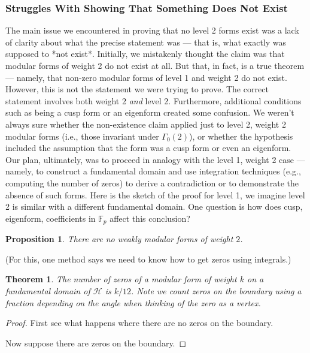 \documentclass{article}
\newtheorem{theorem}{Theorem}[section]
\newtheorem{proposition}{Proposition}[section]
\theoremstyle{definition}
\theoremstyle{definition}
\theoremstyle{definition}
\newcommand{\F}{\mathbb{F}}
\begin{document}
\subsubsection{Struggles With Showing That Something Does Not Exist}

The main issue we encountered in proving that no level 2 forms exist was a lack of clarity about what the precise statement was — that is, what exactly was supposed to *not exist*.
\newline\newline
Initially, we mistakenly thought the claim was that modular forms of weight 2 do not exist at all. But that, in fact, is a true theorem — namely, that non-zero modular forms of level 1 and weight 2 do not exist. However, this is not the statement we were trying to prove.
\newline\newline
The correct statement involves both weight 2 \textit{and} level 2. Furthermore, additional conditions such as being a cusp form or an eigenform created some confusion. We weren't always sure whether the non-existence claim applied just to level 2, weight 2 modular forms (i.e., those invariant under $\Gamma_0(2)$), or whether the hypothesis included the assumption that the form was a cusp form or even an eigenform.
\newline\newline
Our plan, ultimately, was to proceed in analogy with the level 1, weight 2 case — namely, to construct a fundamental domain and use integration techniques (e.g., computing the number of zeros) to derive a contradiction or to demonstrate the absence of such forms.
\newline\newline
Here is the sketch of the proof for level 1, we imagine level 2 is similar with a different fundamental domain.
\newline\newline
One question is how does cusp, eigenform,  coefficients in $\F_p$ affect this conclusion?


\begin{proposition}
    There are no weakly modular forms of weight $2$.
\end{proposition}
(For this, one method says we need to know how to get zeros using integrals.)
\begin{theorem}
    The number of zeros of a modular form of weight $k$ on a fundamental domain of $\mathcal{H}$ is $k/12$. Note we count zeros on the boundary using a fraction depending on the angle when thinking of the zero as a vertex.
\end{theorem}
\begin{proof}
    First see what happens where there are no zeros on the boundary.

    Now suppose there are zeros on the boundary.
\end{proof}
\end{document}
